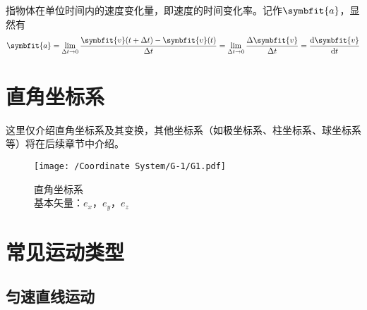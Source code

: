 指物体在单位时间内的速度变化量，即速度的时间变化率。记作$\symbfit{a}$，显然有
$$
\symbfit{a} = \lim_{\Delta t \to 0} \frac{\symbfit{v}(t+\Delta t) - \symbfit{v}(t)}{\Delta t}
= \lim_{\Delta t \to 0} \frac{\Delta \symbfit{v}}{\Delta t}
= \frac{\textup{d} \symbfit{v}}{\textup{d}t}
$$


\section{直角坐标系}
这里仅介绍直角坐标系及其变换，其他坐标系（如极坐标系、柱坐标系、球坐标系等）将在后续章节中介绍。
\begin{figure}
    \texttt{[image: /Coordinate System/G-1/G1.pdf]}
    \caption[Cartesian coordinate system]{
        直角坐标系\\
        \vspace{2cm}
        \normalsize
        基本矢量：${e}_x$，${e}_y$，${e}_z$
        }
    \label{fig:Coordinate System_G1}
\end{figure}


\section{常见运动类型}

\subsection{匀速直线运动}

